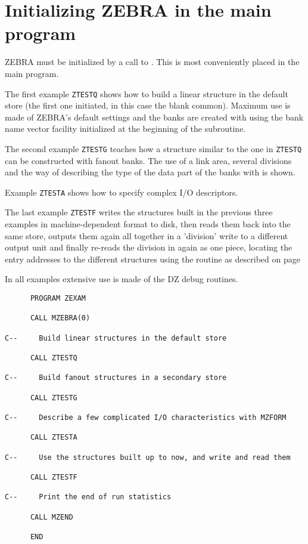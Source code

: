 \section{Initializing ZEBRA in the main program}
\par ZEBRA must be initialized by a call to .
This is most conveniently placed in the main program.
\par
The first example {\tt ZTESTQ} shows how to build a linear structure in the
default store (the first one initiated, in this case the blank common).
Maximum use is made of ZEBRA's default settings and the banks are created with
 using the bank name vector facility initialized at the beginning
of the subroutine. \par
The second example {\tt ZTESTG} teaches how a structure similar to the one in
{\tt ZTESTQ} can be constructed with fanout banks. The use of a link area,
several divisions and the way of describing the type of the data part of the
banks with  is shown.
\par Example {\tt ZTESTA} shows how to specify complex I/O descriptors.
\par The last example {\tt ZTESTF} writes the structures built in the previous
three examples in machine-dependent format to disk, then reads them back into
the same store, outputs them again all together in a 'division' write
to a different output unit and finally re-reads the division in again
as one piece, locating the entry addresses to the different structures
using the  routine as described on page~\pageref{SR_LZLOC}
\par
In all examples extensive use is made of the DZ debug routines.
\begin{verbatim}
      PROGRAM ZEXAM
 
      CALL MZEBRA(0)
 
C--     Build linear structures in the default store
 
      CALL ZTESTQ
 
C--     Build fanout structures in a secondary store
 
      CALL ZTESTG
 
C--     Describe a few complicated I/O characteristics with MZFORM
 
      CALL ZTESTA
 
C--     Use the structures built up to now, and write and read them
 
      CALL ZTESTF
 
C--     Print the end of run statistics
 
      CALL MZEND
 
      END
\end{verbatim}
